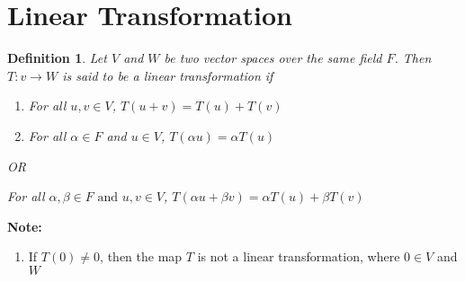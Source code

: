 \documentclass[a4paper, titlepage]{article}
\newtheorem{definition}{Definition}[section]
\begin{document}
\section{Linear Transformation}
    \begin{definition}
        Let $V$ and $W$ be two vector spaces over the same field $F$. Then
        $T : v \rightarrow W$ is said to be a linear transformation if 
        \begin{enumerate}[label=(\alph*)]
            \item For all $u, v \in V$, $T(u + v) = T(u) + T(v)$
            \item For all $\alpha \in F$ and $u \in V$, $T(\alpha u) = \alpha T(u)$
        \end{enumerate}
        \begin{center}
            OR
        \end{center}
        For all $\alpha, \beta \in F \text{ and }u, v \in V$, $T(\alpha u + \beta v) = \alpha T(u) + \beta T(v)$    
    \end{definition}
    \textbf{Note: }
    \begin{enumerate}[label=(\roman*)]
        \item If $T(0) \neq 0$, then the map $T$ is not a linear transformation,
        where $0 \in V$ and $W$
    \end{enumerate}
\end{document}
